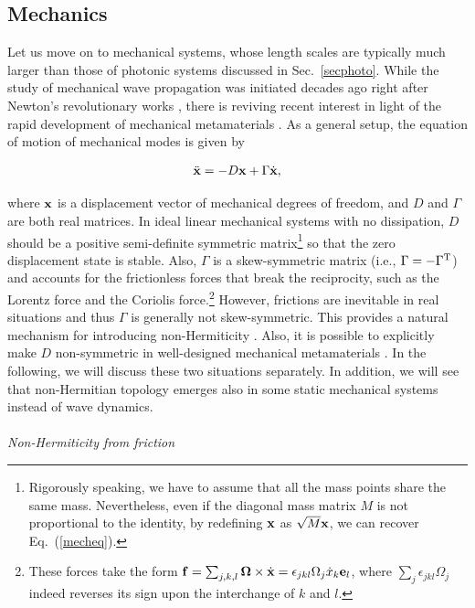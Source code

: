 \documentclass{tADP2e}
\theoremstyle{plain}
\newcommand{\eqn}[1]{
\begin{eqnarray}
	#1
\end{eqnarray}
}
\theoremstyle{plain}
\theoremstyle{definition}
\begin{document}
\subsection{Mechanics}
\label{sec:mech}
Let us move on to mechanical systems, whose length scales are typically much larger than those of photonic systems discussed in Sec.~\ref{secphoto}. While the study of mechanical wave propagation was initiated decades ago right after Newton's revolutionary works \cite{HMI14}, there is reviving recent interest in light of the rapid development of mechanical metamaterials \cite{KB17}. As a general setup, the equation of motion of %
mechanical modes is given by \cite{SR16}
\eqn{\label{mechanics}
\ddot{\bold{x}}=-{ D}\bold{x}+\Gamma\dot{\bold{x}},
\label{mecheq}
}
where $\bold{x}$ is a displacement vector of mechanical degrees of freedom, and $D$ and $\Gamma$ are both real matrices. In ideal linear mechanical systems with no dissipation, $D$ should be a positive semi-definite symmetric matrix\footnote{Rigorously speaking, we have to assume that all the mass points share the same mass. Nevertheless, even if the diagonal mass matrix $M$ is not proportional to the identity, by redefining $\bold{x}$ as $\sqrt{M}\bold{x}$, we can recover Eq.~(\ref{mecheq}).} so that the zero displacement state is stable. Also, $\Gamma$ is a skew-symmetric matrix (i.e., $\Gamma=-\Gamma^{\rm T}$) and accounts for the frictionless forces that break the reciprocity, such as the Lorentz force and the Coriolis force.\footnote{These forces take the form $\bold{f}=\sum_{j,k,l}\bold{\Omega}\times \dot{\bold{x}}=\epsilon_{jkl}\Omega_j \dot{x}_k\bold{e}_l$, where $\sum_j\epsilon_{jkl}\Omega_j$ indeed reverses its sign upon the interchange of $k$ and $l$.} However, frictions are inevitable in real situations and thus $\Gamma$ is generally not skew-symmetric. This provides a natural mechanism for introducing non-Hermiticity \cite{YT19}. Also, it is possible to explicitly make $D$ non-symmetric in well-designed mechanical metamaterials \cite{BM19}. In the following, we will discuss these two situations separately. In addition, we will see that non-Hermitian topology emerges also in some static mechanical systems instead of wave dynamics.
\\ \\ {\it Non-Hermiticity from friction}
\end{document}
